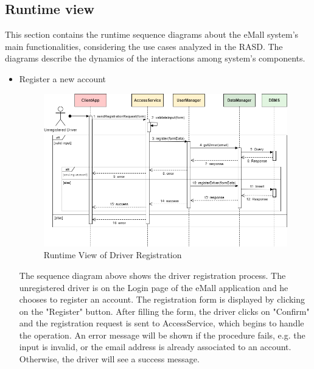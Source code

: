\documentclass[../main.tex]{subfiles}
\begin{document}
\subsection{Runtime view}
This section contains the runtime sequence diagrams about the eMall system's main functionalities, considering the use cases analyzed in the RASD. The diagrams describe the dynamics of the interactions among system's components.

\begin{itemize}
    \item Register a new account
    {
    \vspace{2em}
    \begin{figure}[H]
    \centering
    \includegraphics[width=\textwidth]{runtimeview/rv_registration.png}
    \caption{Runtime View of Driver Registration}
    \label{fig:rv_registration}
    \end{figure}}
    The sequence diagram above shows the driver registration process. The unregistered driver is on the Login page of the eMall application and he chooses to register an account. The registration form is displayed by clicking on the "Register" button. After filling the form, the driver clicks on "Confirm" and the registration request is sent to AccessService, which begins to handle the operation. An error message will be shown if the procedure fails, e.g. the input is invalid, or the email address is already associated to an account. Otherwise, the driver will see a success message.


\end{itemize}
\end{document}
